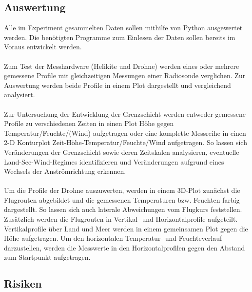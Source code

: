 \documentclass[a4paper,11pt,DIV=calc,tablecaptionabove,headinclude,twoside]{article}
\begin{document}
\subsection{Auswertung}

Alle im Experiment gesammelten Daten sollen mithilfe von Python ausgewertet werden. Die benötigten Programme zum Einlesen der Daten sollen bereits im Voraus entwickelt werden. \\\\
Zum Test der Messhardware (Helikite und Drohne) werden eines oder mehrere gemessene Profile mit gleichzeitigen Messungen einer Radiosonde verglichen. Zur Auswertung werden beide Profile in einem Plot dargestellt und vergleichend analysiert.\\\\
Zur Untersuchung der Entwicklung der Grenzschicht werden entweder gemessene Profile zu verschiedenen Zeiten in einen Plot Höhe gegen Temperatur/Feuchte/(Wind) aufgetragen oder eine komplette Messreihe in einen 2-D Konturplot Zeit-Höhe-Temperatur/Feuchte/Wind aufgetragen. So lassen sich Veränderungen der Grenzschicht sowie deren Zeitskalen analysieren, eventuelle Land-See-Wind-Regimes identifizieren und Veränderungen aufgrund eines Wechsels der Anströmrichtung erkennen.\\\\
Um die Profile der Drohne auszuwerten, werden in einem 3D-Plot zunächst die Flugrouten abgebildet und die gemessenen Temperaturen bzw. Feuchten farbig dargestellt. So lassen sich auch laterale Abweichungen vom Flugkurs feststellen. Zusätzlich werden die Flugrouten in Vertikal- und Horizontalprofile aufgeteilt. Vertikalprofile über Land und Meer werden in einem gemeinsamen Plot gegen die Höhe aufgetragen. Um den horizontalen Temperatur- und Feuchteverlauf darzustellen, werden die Messwerte in den Horizontalprofilen gegen den Abstand zum Startpunkt aufgetragen.    

\subsection{Risiken}
\label{Risiken}
\end{document}
